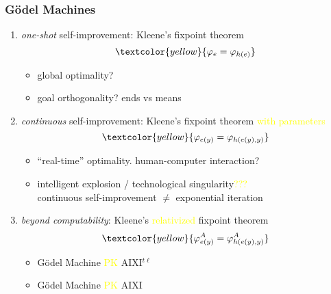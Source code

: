\documentclass[UTF8,aspectratio=43,11pt,colorlinks,compress,openany]{beamer}%
\begin{document}
\begin{frame}\frametitle{G\"odel Machines}
\begin{enumerate}
	\item \emph{one-shot} self-improvement: Kleene's fixpoint theorem
	\[\textcolor{yellow}{\varphi_e=\varphi_{h(e)}}\]
	\begin{itemize}
		\item global optimality?
		\item goal orthogonality? ends vs means
	\end{itemize}
	\item \emph{continuous} self-improvement: Kleene's fixpoint theorem \textcolor{yellow}{with parameters}
	\[\textcolor{yellow}{\varphi_{e(y)}=\varphi_{h(e(y),y)}}\]
	\begin{itemize}
		\item ``real-time'' optimality. human-computer interaction?
		\item intelligent explosion / technological singularity\textcolor{yellow}{???}\\
		continuous self-improvement $\ne$ exponential iteration
	\end{itemize}
	\item \emph{beyond computability}: Kleene's \textcolor{yellow}{relativized} fixpoint theorem
	\[\textcolor{yellow}{\varphi_{e(y)}^A=\varphi_{h(e(y),y)}^A}\]
	\begin{itemize}
		\item G\"odel Machine \textcolor{yellow}{PK} AIXI$^{t\ell}$
		\item G\"odel Machine \textcolor{yellow}{PK} AIXI
	\end{itemize}
\end{enumerate}
\end{frame}
\end{document}

